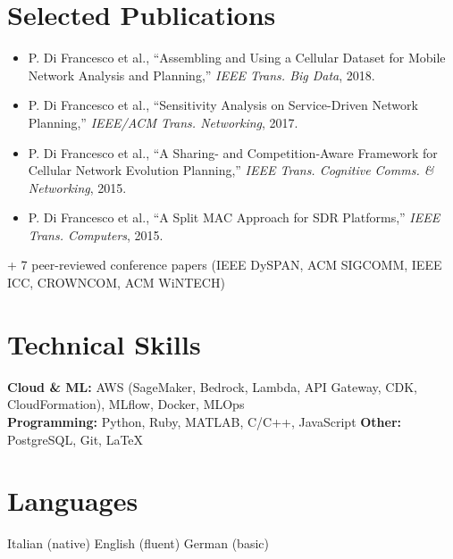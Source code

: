 \documentclass[10pt,a4paper]{article}
\begin{document}
\section{Selected Publications}

\vspace{-2pt}
\begin{itemize}[nosep,leftmargin=*]
\item P. Di Francesco et al., ``Assembling and Using a Cellular Dataset for Mobile Network Analysis and Planning,'' \textit{IEEE Trans. Big Data}, 2018.
\item P. Di Francesco et al., ``Sensitivity Analysis on Service-Driven Network Planning,'' \textit{IEEE/ACM Trans. Networking}, 2017.
\item P. Di Francesco et al., ``A Sharing- and Competition-Aware Framework for Cellular Network Evolution Planning,'' \textit{IEEE Trans. Cognitive Comms. \& Networking}, 2015.
\item P. Di Francesco et al., ``A Split MAC Approach for SDR Platforms,'' \textit{IEEE Trans. Computers}, 2015.
\end{itemize}
{\small + 7 peer-reviewed conference papers (IEEE DySPAN, ACM SIGCOMM, IEEE ICC, CROWNCOM, ACM WiNTECH)}

\section{Technical Skills}

{\small
\textbf{Cloud \& ML:} AWS (SageMaker, Bedrock, Lambda, API Gateway, CDK, CloudFormation), MLflow, Docker, MLOps\\
\textbf{Programming:} Python, Ruby, MATLAB, C/C++, JavaScript \quad
\textbf{Other:} PostgreSQL, Git, LaTeX
}

\section{Languages}

{\small Italian (native) \quad English (fluent) \quad German (basic)}
\end{document}
